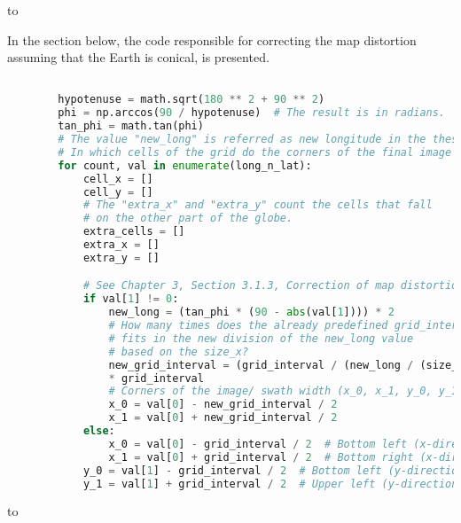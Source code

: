 \documentclass[12pt,a4paper,notitlepage,oneside,openright]{report}
\begin{document}
\def\dashfill{\cleaders\hbox{-}\hfill}
\hbox to \hsize{\dashfill\hfil}

In the section below, the code responsible for correcting the map distortion assuming that the Earth is conical, is presented.
\begin{center}
\begin{lstlisting}[language=Python, formfeed=\newpage, extendedchars=true] 

		hypotenuse = math.sqrt(180 ** 2 + 90 ** 2)
        phi = np.arccos(90 / hypotenuse)  # The result is in radians.
        tan_phi = math.tan(phi)
        # The value "new_long" is referred as new longitude in the thesis.
        # In which cells of the grid do the corners of the final image fall?
        for count, val in enumerate(long_n_lat):
            cell_x = []
            cell_y = []
            # The "extra_x" and "extra_y" count the cells that fall
            # on the other part of the globe.
            extra_cells = []
            extra_x = []
            extra_y = []

			# See Chapter 3, Section 3.1.3, Correction of map distortion
            if val[1] != 0:
                new_long = (tan_phi * (90 - abs(val[1]))) * 2
                # How many times does the already predefined grid_interval
                # fits in the new division of the new_long value
                # based on the size_x?
                new_grid_interval = (grid_interval / (new_long / (size_x - 1)))
                * grid_interval
                # Corners of the image/ swath width (x_0, x_1, y_0, y_1)
                x_0 = val[0] - new_grid_interval / 2
                x_1 = val[0] + new_grid_interval / 2
            else:
                x_0 = val[0] - grid_interval / 2  # Bottom left (x-direction)
                x_1 = val[0] + grid_interval / 2  # Bottom right (x-direction)
            y_0 = val[1] - grid_interval / 2  # Bottom left (y-direction)
            y_1 = val[1] + grid_interval / 2  # Upper left (y-direction)

\end{lstlisting}
\end{center}

\def\dashfill{\cleaders\hbox{-}\hfill}
\hbox to \hsize{\dashfill\hfil}
\end{document}

